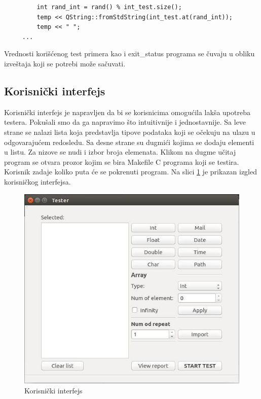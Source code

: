 \documentclass[a4paper]{article}
\begin{document}
{\begin{verbatim}
         int rand_int = rand() % int_test.size();
         temp << QString::fromStdString(int_test.at(rand_int));
         temp << " ";
     ...
 \end{verbatim}
 
Vrednosti korišćenog test primera kao i exit\_status programa se čuvaju u obliku izveštaja koji se potrebi može sačuvati.

\subsection{Korisnički interfejs}
\label{subsec:korisnicki_interfejs_testera}

Korisnički interfejs je napravljen da bi se korisnicima omogućila lakša upotreba testera. Pokušali smo da ga napravimo što intuitivnije i jednostavnije. 
Sa leve strane se nalazi lista koja predstavlja tipove podataka koji se očekuju na ulazu u odgovarajućem redosledu. Sa desne strane su dugmići kojima se dodaju elementi u listu. Za nizove se nudi i izbor broja elemenata. Klikom na dugme učitaj program se otvara prozor kojim se bira Makefile C programa koji se testira. Korisnik zadaje koliko puta će se pokrenuti program. Na slici \ref{fig:interfejs} je prikazan izgled korisničkog interfejsa. \\

\begin{figure}[h!]
\begin{center}
\includegraphics[scale=0.5]{korisnicki_interfejs.jpg}
\end{center}
\caption{Korisnički interfejs}
\label{fig:interfejs}
\end{figure}

}
\end{document}
